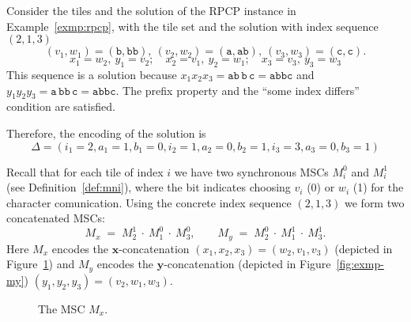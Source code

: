 \begin{example}\label{exm:teo}
Consider the tiles and the solution of the RPCP instance 
in Example~\ref{exmp:rpcp}, with the tile set and the solution
with index sequence $(2,1,3)$
$$
 (v_1,w_1)=(\texttt{b},\texttt{bb}),\ 
 (v_2,w_2)=(\texttt{a},\texttt{ab}),\ 
 (v_3,w_3)=(\texttt{c},\texttt{c}).
$$
$$
 x_1=w_2,\ y_1=v_2;\quad x_2=v_1,\ y_2=w_1;\quad x_3=v_3,\ y_3=w_3
$$
This sequence is a solution because
$x_1x_2x_3=\texttt{ab}\,\texttt{b}\,\texttt{c}=\texttt{abbc}$ and
$y_1y_2y_3=\texttt{a}\,\texttt{bb}\,\texttt{c}=\texttt{abbc}$. The
prefix property and the ``some index differs'' condition are satisfied.

Therefore, the encoding of the solution is
$$\Delta = (i_1=2,a_1=1,b_1=0,i_2=1,a_2=0,b_2=1,i_3=3,a_3=0,b_3=1)$$

Recall that for each tile of index \(i\) we have two synchronous MSCs
\(M_i^0\) and \(M_i^1\) (see Definition~\ref{def:mni}), where the bit
indicates choosing \(v_i\) (0) or \(w_i\) (1) for the character comunication.
Using the concrete index sequence \((2,1,3)\) we form two
concatenated MSCs:
\[
  M_x\;=\; M^{1}_{2}\ \cdot\ M^{0}_{1}\ \cdot\ M^{0}_{3},
\qquad
  M_y\;=\; M^{0}_{2}\ \cdot\ M^{1}_{1}\ \cdot\ M^{1}_{3}.
\]
Here \(M_x\) encodes the \(\mathbf{x}\)-concatenation
\((x_1,x_2,x_3)=(w_2,v_1,v_3)\) (depicted 
in Figure~\ref{fig:exmp-mx}) and \(M_y\) encodes 
the \(\mathbf{y}\)-concatenation (depicted in 
Figure~\ref{fig:exmp-my}) \((y_1,y_2,y_3)=(v_2,w_1,w_3)\).

\begin{figure}[!ht]
\centering
\begin{msc}[draw frame=none, draw head=none, msc keyword=, head height=0px, label distance=0.5ex, foot height=0px, foot distance=0px]{}
	\declinst{P2}{P2}{}



\end{msc}
\caption{The MSC $M_x$.}
\label{fig:exmp-mx}
\end{figure}


\end{example}
